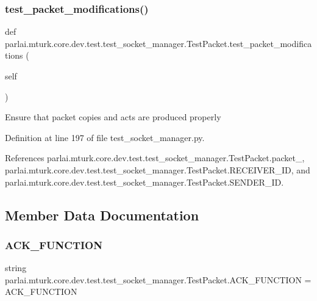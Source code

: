 \subsubsection{\texorpdfstring{test\+\_\+packet\+\_\+modifications()}{test\_packet\_modifications()}}
{\footnotesize\ttfamily def parlai.\+mturk.\+core.\+dev.\+test.\+test\+\_\+socket\+\_\+manager.\+Test\+Packet.\+test\+\_\+packet\+\_\+modifications (\begin{DoxyParamCaption}\item[{}]{self }\end{DoxyParamCaption})}

\begin{DoxyVerb}Ensure that packet copies and acts are produced properly\end{DoxyVerb}
 

Definition at line 197 of file test\+\_\+socket\+\_\+manager.\+py.



References parlai.\+mturk.\+core.\+dev.\+test.\+test\+\_\+socket\+\_\+manager.\+Test\+Packet.\+packet\+\_, parlai.\+mturk.\+core.\+dev.\+test.\+test\+\_\+socket\+\_\+manager.\+Test\+Packet.\+R\+E\+C\+E\+I\+V\+E\+R\+\_\+\+ID, and parlai.\+mturk.\+core.\+dev.\+test.\+test\+\_\+socket\+\_\+manager.\+Test\+Packet.\+S\+E\+N\+D\+E\+R\+\_\+\+ID.



\subsection{Member Data Documentation}
\mbox{\label{classparlai_1_1mturk_1_1core_1_1dev_1_1test_1_1test__socket__manager_1_1TestPacket_a57f199f5d90d500fb07f8dc101af85e4}} 
\subsubsection{\texorpdfstring{A\+C\+K\+\_\+\+F\+U\+N\+C\+T\+I\+ON}{ACK\_FUNCTION}}
{\footnotesize\ttfamily string parlai.\+mturk.\+core.\+dev.\+test.\+test\+\_\+socket\+\_\+manager.\+Test\+Packet.\+A\+C\+K\+\_\+\+F\+U\+N\+C\+T\+I\+ON = \textquotesingle{}A\+C\+K\+\_\+\+F\+U\+N\+C\+T\+I\+ON\textquotesingle{}\hspace{0.3cm}{\ttfamily [static]}}



